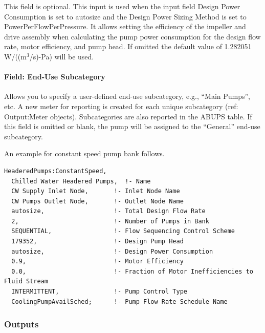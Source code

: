 This field is optional. This input is used when the input field Design Power Consumption is set to autosize and the Design Power Sizing Method is set to PowerPerFlowPerPressure. It allows setting the efficiency of the impeller and drive assembly when calculating the pump power consumption for the design flow rate, motor efficiency, and pump head. If omitted the default value of 1.282051 W/((m\(^{3}\)/s)-Pa) will be used.

\paragraph{Field: End-Use Subcategory}

Allows you to specify a user-defined end-use subcategory, e.g., ``Main Pumps'', etc. A new meter for reporting is created for each unique subcategory (ref: Output:Meter objects). Subcategories are also reported in the ABUPS table. If this field is omitted or blank, the pump will be assigned to the ``General'' end-use subcategory.

An example for constant speed pump bank follows.

\begin{lstlisting}
HeaderedPumps:ConstantSpeed,
  Chilled Water Headered Pumps,  !- Name
  CW Supply Inlet Node,       !- Inlet Node Name
  CW Pumps Outlet Node,       !- Outlet Node Name
  autosize,                   !- Total Design Flow Rate
  2,                          !- Number of Pumps in Bank
  SEQUENTIAL,                 !- Flow Sequencing Control Scheme
  179352,                     !- Design Pump Head
  autosize,                   !- Design Power Consumption
  0.9,                        !- Motor Efficiency
  0.0,                        !- Fraction of Motor Inefficiencies to Fluid Stream
  INTERMITTENT,               !- Pump Control Type
  CoolingPumpAvailSched;      !- Pump Flow Rate Schedule Name
\end{lstlisting}

\subsubsection{Outputs}\label{outputs-3-014}

